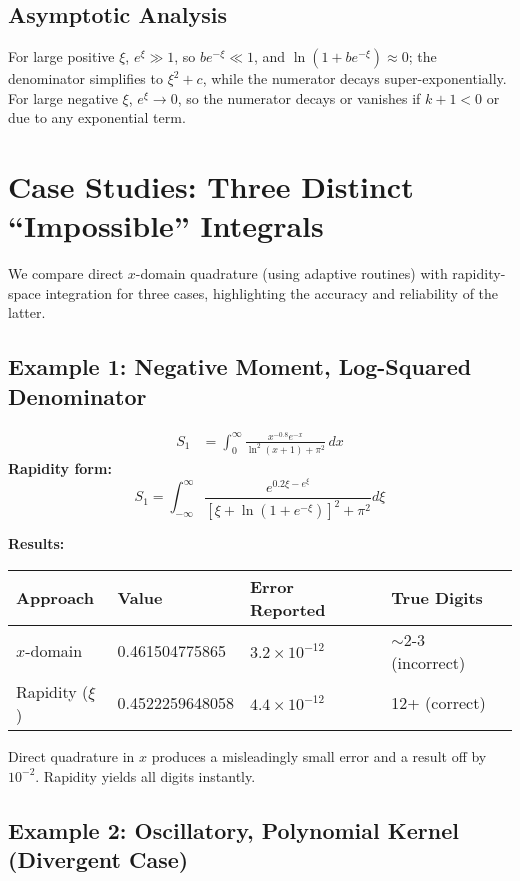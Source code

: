 \documentclass[12pt]{article}
\begin{document}
\subsection*{Asymptotic Analysis}
For large positive $\xi$, $e^{\xi} \gg 1$, so $b e^{-\xi} \ll 1$, and $\ln(1 + b e^{-\xi}) \approx 0$; the denominator simplifies to $\xi^2 + c$, while the numerator decays super-exponentially. For large negative $\xi$, $e^{\xi} \to 0$, so the numerator decays or vanishes if $k+1<0$ or due to any exponential term.

\section{Case Studies: Three Distinct ``Impossible'' Integrals}

We compare direct $x$-domain quadrature (using adaptive routines) with rapidity-space integration for three cases, highlighting the accuracy and reliability of the latter.

\subsection{Example 1: Negative Moment, Log-Squared Denominator}

\begin{align*}
S_1 &= \int_0^\infty \frac{x^{-0.8} e^{-x}}{\ln^2(x+1)+\pi^2}\,dx
\end{align*}
\noindent
\textbf{Rapidity form:}
\[
S_1 = \int_{-\infty}^{\infty} \frac{e^{0.2\xi - e^{\xi}}}{[\xi+\ln(1+e^{-\xi})]^2 + \pi^2} d\xi
\]

\noindent
\textbf{Results:}
\begin{center}
\begin{tabular}{l|l|l|l}
Approach          & Value            & Error Reported     & True Digits  \\
\hline
$x$-domain        & 0.461504775865   & $3.2 \times 10^{-12}$ & $\sim$2-3 (incorrect) \\
Rapidity ($\xi$)  & 0.4522259648058  & $4.4 \times 10^{-12}$ & 12+ (correct) \\
\end{tabular}
\end{center}
Direct quadrature in $x$ produces a misleadingly small error and a result off by $10^{-2}$. Rapidity yields all digits instantly.

\subsection{Example 2: Oscillatory, Polynomial Kernel (Divergent Case)}
\end{document}
